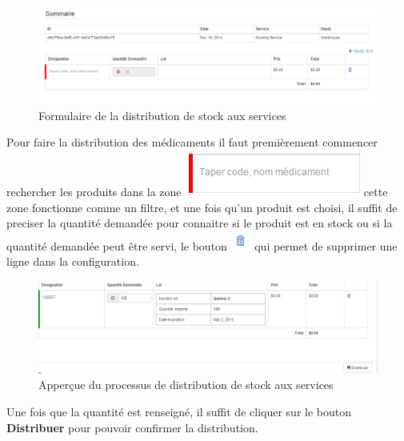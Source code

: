 \documentclass[12pt,a4paper]{report}
\begin{document}
\begin{figure}[h]
\begin{center}
\includegraphics[width=14cm]{pic/FormulaireDistrService.png}
\end{center}
\caption{Formulaire de la distribution de stock aux services}
\label{Formulaire de la distribution de stock aux services}
\end{figure}
\newpage
Pour faire la distribution des médicaments il faut premièrement commencer rechercher les produits dans la zone \includegraphics[scale=0.7]{pic/RecherMedicament.png} cette zone fonctionne comme un filtre, et une fois qu'un produit est choisi, il suffit de preciser la quantité demandée pour connaitre si le produit est en stock ou si la quantité demandée peut être servi, le bouton \includegraphics[scale=0.7]{pic/RecycleBlue.png} qui permet de supprimer une ligne dans la configuration. 

\begin{figure}[h]
\begin{center}
\includegraphics[width=14cm]{pic/procDistService.png}
\end{center}
\caption{Apperçue du processus de distribution de stock aux services}
\label{Apperçue du processus de distribution de stock aux services}
\end{figure}

Une fois que la quantité est renseigné, il suffit de cliquer sur le bouton \textbf{Distribuer} pour pouvoir confirmer la distribution.
\end{document}
